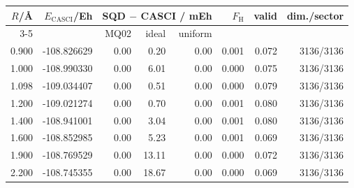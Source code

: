 \begin{tabular}{rrrrrrrr}
\toprule
$R$/\AA & $E_\mathrm{CASCI}$/Eh & \multicolumn{3}{c}{SQD $-$ CASCI / mEh} & $F_\mathrm{H}$ & valid & dim./sector \\
\cmidrule(lr){3-5}
 & & MQ02 & ideal & uniform & & & \\
\midrule
0.900 & -108.826629 & 0.00 & 0.20 & 0.00 & 0.001 & 0.072 & 3136/3136 \\
1.000 & -108.990330 & 0.00 & 6.01 & 0.00 & 0.000 & 0.075 & 3136/3136 \\
1.098 & -109.034407 & 0.00 & 0.51 & 0.00 & 0.000 & 0.079 & 3136/3136 \\
1.200 & -109.021274 & 0.00 & 0.70 & 0.00 & 0.001 & 0.080 & 3136/3136 \\
1.400 & -108.941001 & 0.00 & 3.04 & 0.00 & 0.001 & 0.080 & 3136/3136 \\
1.600 & -108.852985 & 0.00 & 5.23 & 0.00 & 0.001 & 0.069 & 3136/3136 \\
1.900 & -108.769529 & 0.00 & 13.11 & 0.00 & 0.000 & 0.072 & 3136/3136 \\
2.200 & -108.745355 & 0.00 & 18.67 & 0.00 & 0.000 & 0.069 & 3136/3136 \\
\bottomrule
\end{tabular}
